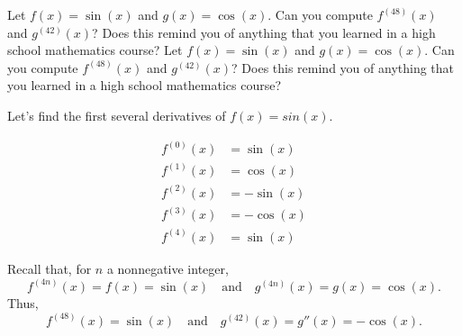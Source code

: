\documentclass[nooutcomes,handout]{ximera}
\begin{document}
\begin{problem}
Let $f(x) = \sin(x)$ and $g(x) = \cos(x)$.  Can you compute $f^{(48)}(x)$ and $g^{(42)}(x)$?  Does this remind you of anything that you learned in a high school mathematics course?  Let $f(x) = \sin(x)$ and $g(x) = \cos(x)$.
  Can you compute $f^{(48)}(x)$ and $g^{(42)}(x)$?
  Does this remind you of anything that you learned in a high school mathematics course?

\begin{freeResponse}
Let's find the first several derivatives of $f(x)=sin(x)$.

	\begin{align*}
	f^{(0)}(x)&=\sin(x)\\
	f^{(1)}(x)&=\cos(x)\\
	f^{(2)}(x)&=-\sin(x)\\
	f^{(3)}(x)&=-\cos(x)\\
	f^{(4)}(x)&=\sin(x)
	\end{align*}

  Recall that, for $n$ a nonnegative integer,
  $$f^{(4n)}(x) = f(x) = \sin(x) \quad \text{and} \quad g^{(4n)}(x) = g(x) = \cos(x).$$
  Thus, 
  $$f^{(48)}(x) = \sin(x) \quad \text{and} \quad g^{(42)}(x) = g''(x) = - \cos(x).$$  



\end{freeResponse}

\end{problem}
	



	
	
			
			











\end{document}
